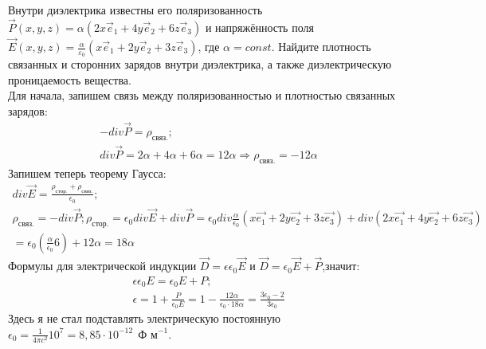 \documentclass[__main__.tex]{subfiles}
\begin{document}
Внутри диэлектрика известны его поляризованность $\vec{P}(x,y,z)=\alpha (2x\vec{e}_1+4y\vec{e}_2+6z\vec{e}_3)$ и напряжённость поля $\vec{E}(x,y,z)=\frac{\alpha}{\varepsilon_0}(x\vec{e}_1+2y\vec{e}_2+3z\vec{e}_3)$, где $\alpha=const$. Найдите плотность связанных и сторонних зарядов внутри диэлектрика, а также диэлектрическую проницаемость вещества.\\ 

Для начала, запишем связь между поляризованностью и плотностью связанных зарядов:\\
\begin{gather}
-div\vec{P} = \rho_{\text{связ.}};\\
div \vec{P} = 2\alpha + 4\alpha +6\alpha = 12\alpha \Longrightarrow \rho_{\text{связ.}}=-12\alpha
\end{gather}
Запишем теперь теорему Гаусса:\\
\begin{gather}
div\vec{E} = \frac{\rho_{\text{стор.}}+\rho_{\text{связ.}}}{\epsilon_0};\\
\rho_{\text{связ.}}= -div\vec{P};
\rho_{\text{стор.}}= \epsilon_0div\vec{E}+div\vec{P}=\epsilon_0div\frac{\alpha}{\epsilon_0}(x\vec{e_1}+2y\vec{e_2}+3z\vec{e_3})+div(2x\vec{e_1}+4y\vec{e_2}+6z\vec{e_3})\\= \epsilon_0(\frac{\alpha}{\epsilon_0}6)+12\alpha = 18\alpha
\end{gather}
Формулы для электрической индукции $\vec{D} = \epsilon \epsilon_0 \vec{E}$ и $\vec{D} = \epsilon_0\vec{E}+\vec{P}$,значит:\\
\begin{gather}
\epsilon \epsilon_0 E = \epsilon_0 E+P;\\
\epsilon = 1 +\frac{P}{\epsilon_0 E} = 1 - \frac{12\alpha}{\epsilon_0 \cdot 18\alpha} = \frac{3\epsilon_0 - 2}{3\epsilon_0}
\end{gather}
Здесь я не стал подставлять электрическую постоянную $\epsilon_0 =\frac{1}{4\pi c^2}10^7 = 8,85 \cdot 10^{-12} \ \ \text{Ф м}^{-1}$.
\end{document}
